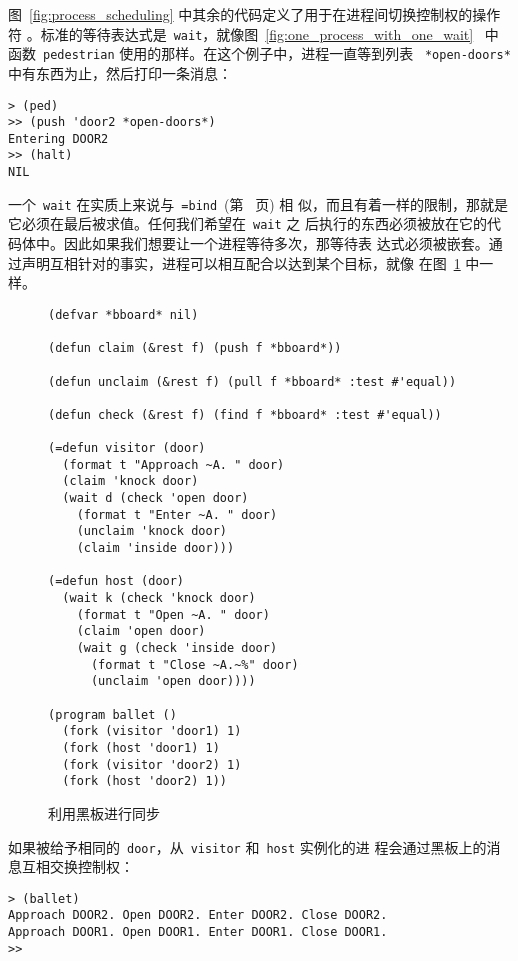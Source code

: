 图~\ref{fig:process_scheduling} 中其余的代码定义了用于在进程间切换控制权的操作符
。标准的等待表达式是~\texttt{wait}，就像图~\ref{fig:one_process_with_one_wait}~
中函数~\texttt{pedestrian} 使用的那样。在这个例子中，进程一直等到列表
~\texttt{*open-doors*} 中有东西为止，然后打印一条消息：

\begin{lstlisting}
> (ped)
>> (push 'door2 *open-doors*)
Entering DOOR2
>> (halt)
NIL
\end{lstlisting}

一个~\texttt{wait} 在实质上来说与~\texttt{=bind}~(第~\pageref{page:bind} 页) 相
似，而且有着一样的限制，那就是它必须在最后被求值。任何我们希望在~\texttt{wait} 之
后执行的东西必须被放在它的代码体中。因此如果我们想要让一个进程等待多次，那等待表%
达式必须被嵌套。通过声明互相针对的事实，进程可以相互配合以达到某个目标，就像
在图~\ref{fig:synchronization_with_a_blackboard} 中一样。

\begin{figure}
\begin{lstlisting}
(defvar *bboard* nil)

(defun claim (&rest f) (push f *bboard*))

(defun unclaim (&rest f) (pull f *bboard* :test #'equal))

(defun check (&rest f) (find f *bboard* :test #'equal))

(=defun visitor (door)
  (format t "Approach ~A. " door)
  (claim 'knock door)
  (wait d (check 'open door)
    (format t "Enter ~A. " door)
    (unclaim 'knock door)
    (claim 'inside door)))

(=defun host (door)
  (wait k (check 'knock door)
    (format t "Open ~A. " door)
    (claim 'open door)
    (wait g (check 'inside door)
      (format t "Close ~A.~%" door)
      (unclaim 'open door))))

(program ballet ()
  (fork (visitor 'door1) 1)
  (fork (host 'door1) 1)
  (fork (visitor 'door2) 1)
  (fork (host 'door2) 1))
\end{lstlisting}
\caption{利用黑板进行同步}
\label{fig:synchronization_with_a_blackboard}
\end{figure}

如果被给予相同的~\texttt{door}，从~\texttt{visitor} 和~\texttt{host} 实例化的进
程会通过黑板上的消息互相交换控制权：

\begin{lstlisting}
> (ballet)
Approach DOOR2. Open DOOR2. Enter DOOR2. Close DOOR2.
Approach DOOR1. Open DOOR1. Enter DOOR1. Close DOOR1.
>>
\end{lstlisting}

